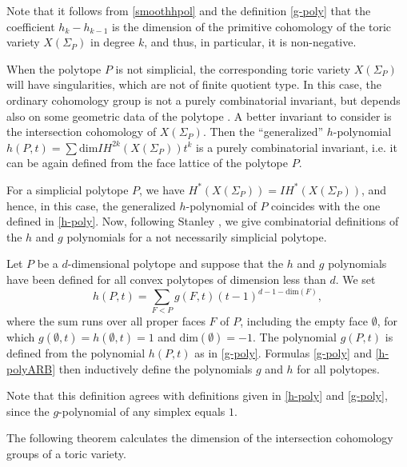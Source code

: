 \begin{rema}
	Note that it follows from \eqref{smoothhpol} and the definition 
	\eqref{g-poly} that the coefficient $h_k-h_{k-1}$ is the dimension of the 
	primitive cohomology of the toric variety $X(\Sigma_P)$ in degree $k$, and 
	thus, in particular, it is non-negative.
\end{rema}


When the polytope $P$ is not simplicial, the corresponding toric variety 
$X(\Sigma_P)$ will have singularities, which are not of finite quotient type. 
In this case, the 
ordinary cohomology group is not a purely combinatorial invariant, but depends 
also on some geometric data of the polytope \cite{McConnel}. A better invariant 
to consider is the intersection cohomology of $X(\Sigma_P)$.  
Then the ``generalized'' $h$-polynomial $h(P, t) = 
\sum\mathrm{dim}IH^{2k}(X(\Sigma_P))t^k$ is a purely combinatorial invariant, 
i.e.  it can be again defined from the face lattice of the polytope $P$.  

For a simplicial polytope $P$, we have $H^*(X(\Sigma_P))=IH^*(X(\Sigma_P))$, 
and hence, in this case,  the generalized $h$-polynomial of $P$ coincides with 
the one defined in \eqref{h-poly}. Now, following Stanley \cite{Stanley}, we give combinatorial definitions of the 
$h$ and $g$ polynomials for a not necessarily simplicial polytope.

Let $P$ be a $d$-dimensional polytope and suppose that the $h$ and $g$ polynomials have been defined for all convex polytopes of dimension less than $d$. We set
\begin{equation}\label{h-polyARB}
h(P, t) = \sum_{F<P}g(F,  t)(t-1)^{d-1-\mathrm{dim}(F)},
\end{equation}
where the sum runs over all proper faces $F$ of $P$, including the empty face 
$\emptyset$, for which $g(\emptyset,t) = h(\emptyset,t) = 1$ and 
$\mathrm{dim}(\emptyset) = -1$. The polynomial $g(P,t)$ is defined from the 
polynomial $h(P,t)$ as in \eqref{g-poly}. Formulas \eqref{g-poly} and 
\eqref{h-polyARB} then inductively define the polynomials $ g $ and $ h $ for 
all polytopes.

\begin{rema}
Note that this definition agrees with  definitions given in  \eqref{h-poly} and \eqref{g-poly}, since the $g$-polynomial of any simplex equals $1$.
\end{rema}

The following theorem calculates the dimension of the intersection cohomology groups of a toric variety.

